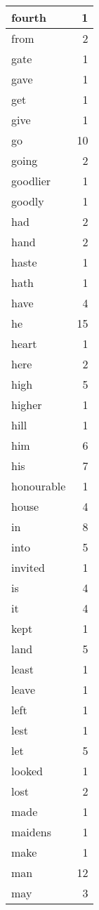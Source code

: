 \begin{center}
\begin{longtable}{l|r}
fourth & 1 \\ \hline
from & 2 \\ \hline
gate & 1 \\ \hline
gave & 1 \\ \hline
get & 1 \\ \hline
give & 1 \\ \hline
go & 10 \\ \hline
going & 2 \\ \hline
goodlier & 1 \\ \hline
goodly & 1 \\ \hline
had & 2 \\ \hline
hand & 2 \\ \hline
haste & 1 \\ \hline
hath & 1 \\ \hline
have & 4 \\ \hline
he & 15 \\ \hline
heart & 1 \\ \hline
here & 2 \\ \hline
high & 5 \\ \hline
higher & 1 \\ \hline
hill & 1 \\ \hline
him & 6 \\ \hline
his & 7 \\ \hline
honourable & 1 \\ \hline
house & 4 \\ \hline
in & 8 \\ \hline
into & 5 \\ \hline
invited & 1 \\ \hline
is & 4 \\ \hline
it & 4 \\ \hline
kept & 1 \\ \hline
land & 5 \\ \hline
least & 1 \\ \hline
leave & 1 \\ \hline
left & 1 \\ \hline
lest & 1 \\ \hline
let & 5 \\ \hline
looked & 1 \\ \hline
lost & 2 \\ \hline
made & 1 \\ \hline
maidens & 1 \\ \hline
make & 1 \\ \hline
man & 12 \\ \hline
may & 3 \\ \hline

\end{longtable}
\end{center}
